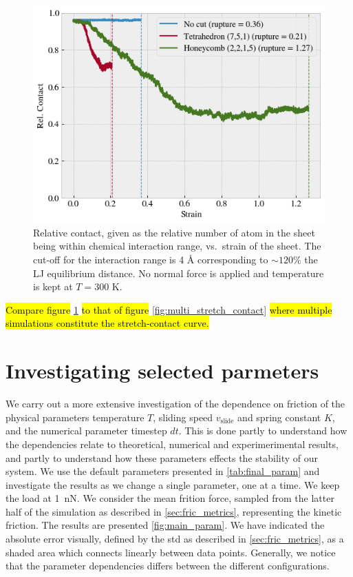 \begin{figure}[H]
  \centering
  \includegraphics[width=0.6\linewidth]{figures/baseline/contact_vs_stretch.png}
  \caption{Relative contact, given as the relative number of atom in the sheet being within chemical interaction range, vs.\ strain of the sheet.  The cut-off for the interaction range is 4 Å corresponding to $\sim 120 \%$ the LJ equilibrium distance. No normal force is applied and temperature is kept at $T = 300$ K.}
  \label{fig:contact_vs_stretch}
\end{figure}

\hl{Compare figure} \cref{fig:contact_vs_stretch} \hl{to that of figure} \cref{fig:multi_stretch_contact} \hl{where multiple simulations constitute the stretch-contact curve.}


\section{Investigating selected parmeters}
We carry out a more extensive investigation of the dependence on friction of the
physical parameters temperature $T$, sliding speed $v_{\text{slide}}$ and spring
constant $K$, and the numerical parameter timestep $dt$. This is done partly to
understand how the dependencies relate to theoretical, numerical and
experimerimental results, and partly to understand how these parameters effects
the stability of our system. We use the default parameters presented in
\cref{tab:final_param} and investigate the results as we change a single
parameter, one at a time. We keep the load at \SI{1}{nN}. We consider the mean
frition force, sampled from the latter half of the simulation as described in
\cref{sec:fric_metrics}, representing the kinetic friction. The results are
presented \cref{fig:main_param}. We have indicated the absolute error visually,
defined by the \acrshort{std} as described in \cref{sec:fric_metrics}, as a
shaded area which connects linearly between data points. Generally, we notice
that the parameter dependencies differs between the different configurations. 

